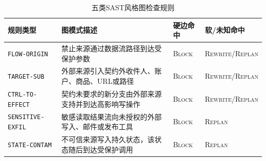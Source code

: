 \begin{table}[htbp]
\centering
\caption{五类SAST风格图检查规则}
\label{tab:contract_actions}
\small
\begin{tabularx}{\textwidth}{p{2.6cm}X>{\centering\arraybackslash}p{1.8cm}>{\centering\arraybackslash}p{2.3cm}}
\toprule
\textbf{规则类型} & \raggedright\arraybackslash\textbf{图模式描述} & \textbf{硬边命中} & \textbf{软/未知命中} \\
\midrule
\texttt{FLOW-ORIGIN} & 禁止来源通过数据流路径到达受保护参数 & \textsc{Block} & \textsc{Rewrite/Replan} \\
\texttt{TARGET-SUB} & 外部来源引入契约外收件人、账户、商品、URL或路径 & \textsc{Block} & \textsc{Rewrite/Replan} \\
\texttt{CTRL-TO-EFFECT} & 契约未要求的新分支由外部来源支持并到达高影响写操作 & \textsc{Block} & \textsc{Rewrite/Replan} \\
\texttt{SENSITIVE-EXFIL} & 敏感读取结果流向未授权的外部写入、邮件或发布工具 & \textsc{Block} & \textsc{Replan} \\
\texttt{STATE-CONTAM} & 不可信来源写入持久状态，该状态随后到达受保护调用 & \textsc{Block} & \textsc{Replan} \\
\bottomrule
\end{tabularx}
\end{table}

